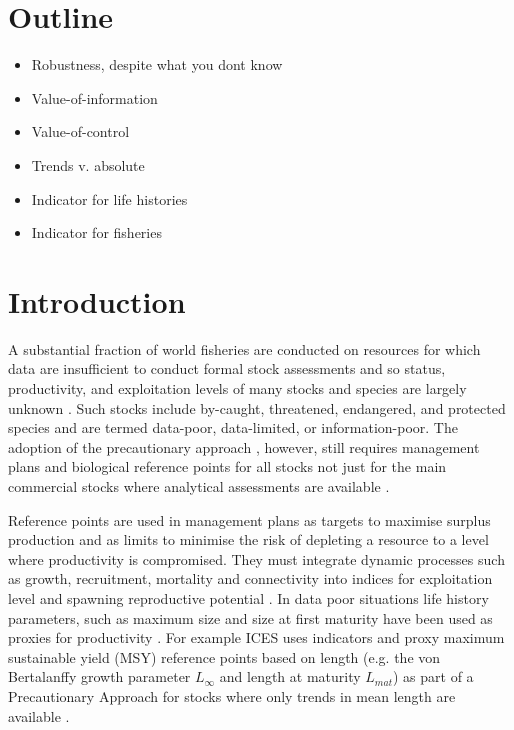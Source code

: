 \documentclass[12pt,doublespacing,a4paper]{ouparticle}
\begin{document}
\newpage


\linenumbers
\linespread{2}

\section{Outline}
\begin{itemize}
 \item Robustness, despite what you dont know
 \item Value-of-information
 \item Value-of-control
 \item Trends v. absolute
 \item Indicator for life histories
 \item Indicator for fisheries
\end{itemize}


\section{Introduction}

A substantial fraction of world fisheries are conducted on resources for which data are insufficient to conduct formal stock assessments and so status, productivity, and exploitation levels of many stocks and species are largely unknown \citep{thorson2015introduction}. Such stocks include by-caught, threatened, endangered, and protected species and are termed data-poor, data-limited, or information-poor. The adoption of the precautionary approach \citep[PA,][]{garcia1996precautionary}, however, still requires management plans and biological reference points for all stocks not just for the main commercial stocks where analytical assessments are available \citep{sainsbury2003ref}. 

Reference points are used in management plans as targets to maximise surplus production and as limits to minimise the risk of depleting a resource to a level where productivity is compromised. They must integrate dynamic processes such as growth, recruitment, mortality and connectivity into indices for exploitation level and spawning reproductive potential \citep{kell2015spawning}. In data poor situations life history parameters, such as maximum size and size at first maturity have been used as proxies for productivity \citep{roff1984evolution,jensen1996beverton,caddy1998short,reynolds2001life,denney2002life}. For example ICES uses indicators and proxy maximum sustainable yield (MSY) reference points based on length (e.g. the von Bertalanffy growth parameter $L_{\infty}$ and length at maturity $L_{mat}$) as part of a Precautionary Approach for stocks where only trends in mean length are available \citep[][]{ref}. 
\end{document}
